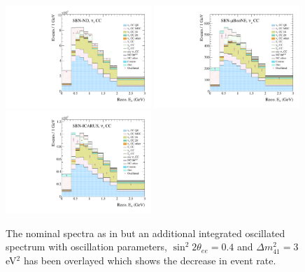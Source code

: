\begin{figure}[h!]
  {\includegraphics[width=0.49\textwidth]{figures-chap6/spectra/nue_disapp_dmsq_3_sinsq_0.4_overlay_spectrum_sbn_nd_BNB_FHC_0_modes.pdf}}
  {\includegraphics[width=0.49\textwidth]{figures-chap6/spectra/nue_disapp_dmsq_3_sinsq_0.4_overlay_spectrum_sbn_uboone_BNB_FHC_1_modes.pdf}}
  {\includegraphics[width=0.49\textwidth]{figures-chap6/spectra/nue_disapp_dmsq_3_sinsq_0.4_overlay_spectrum_sbn_icarus_BNB_FHC_2_modes.pdf}}
  \captionsetup{width=0.49\textwidth}
  \parbox[b]{0.49\textwidth}%
  {
    \caption[SBN \nue disappearance CC inclusive reconstructed neutrino energy spectra with oscillated spectrum overlayed]{The nominal spectra as in  but an additional integrated oscillated spectrum with oscillation parameters, $\sin^2{2\theta_{ee}} = 0.4$ and $\Delta m^2_{41} = 3$ eV$^2$ has been overlayed which shows the decrease in event rate.\\\phantom{.}\\\phantom{.}\\\phantom{.}\\}
    \label{fig:nue_disapp_spectra} 
  }
\end{figure}

